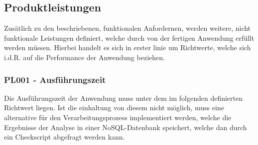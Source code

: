 
\subsection{Produktleistungen}
Zusätlich zu den beschriebenen, funktionalen Anfordernen, werden weitere, nicht funktionale Leistungen definiert, welche durch von der fertigen Anwendung erfüllt werden müssen. Hierbei handelt es sich in erster linie um Richtwerte, welche sich i.d.R. auf die Performance der Anwendung beziehen.

\subsubsection{PL001 - Ausführungszeit}\label{subsubsec:PL001}
Die Ausführungszeit der Anwendung muss unter dem im folgenden definierten Richtwert liegen. Ist die einhaltung von diesem nicht möglich, muss eine alternative für den Verarbeitungsprozess implementiert werden, welche die Ergebnisse der Analyse in einer NoSQL-Datenbank speichert, welche dan durch ein Checkscript abgefragt werden kann.

